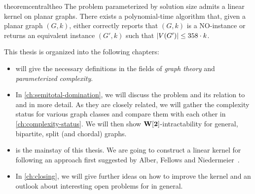 \begin{restatable}[]{theorem}{centraltheo}\label{thm:central}
    The \psdom problem parameterized by solution size admits a linear kernel on planar graphs. 
    There exists a polynomial-time algorithm that, given a planar graph $(G, k)$, either correctly reports that $(G, k)$ is a NO-instance or returns an equivalent instance $(G', k)$ such that $\abs{V(G')} \leq 358 \cdot k$.
\end{restatable}

This thesis is organized into the following chapters:

\begin{itemize}
    \item {} will give the necessary definitions in the fields of \textit{graph theory} and \textit{parameterized complexity}.
    \item In \cref{ch:semitotal-domination}, we will discuss the \sdom problem and its relation to \dom and \tdom in more detail. 
    As they are closely related, we will gather the complexity status for various graph classes and compare them with each other in \cref{ch:complexity-status}. 
    We will then show $\mathbf{W[2]}$-intractability for general, bipartite, split (and chordal) graphs.
    \item {} is the mainstay of this thesis. 
    We are going to construct a linear kernel for \psdom following an approach first suggested by Alber, Fellows and Niedermeier~\cite{Alber2004}. 
    \item In \cref{ch:closing}, we will give further ideas on how to improve the kernel and an outlook about interesting open problems for \sdom in general.
\end{itemize}


